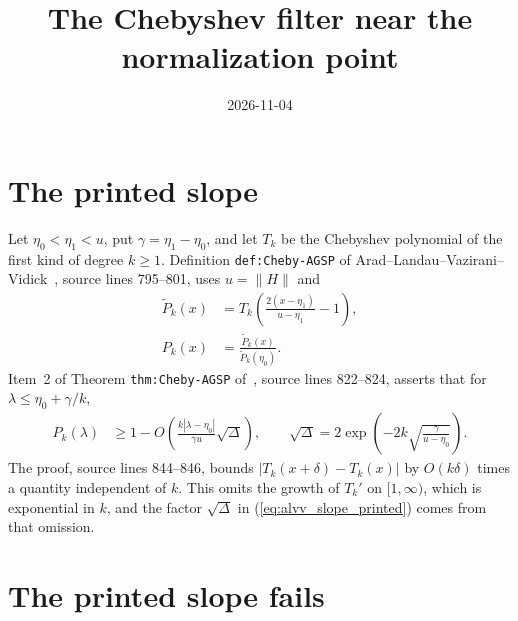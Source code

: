 \documentclass{article}
\title{The Chebyshev filter near the normalization point}
\author{}
\date{2026-11-04}
\begin{document}
\maketitle
{}

\section{The printed slope}

Let $\eta_0<\eta_1<u$, put $\gamma=\eta_1-\eta_0$, and let $T_k$ be the
Chebyshev polynomial of the first kind of degree $k\ge1$.
Definition \texttt{def:Cheby-AGSP} of
Arad--Landau--Vazirani--Vidick~\cite{Arad2016RigorousRG}, source lines
795--801, uses $u=\|H\|$ and
\begin{align}
    \tilde P_k(x) & =T_k\left(\frac{2(x-\eta_1)}{u-\eta_1}-1\right),
    \label{eq:alvv_slope_unnormalized}\\
    P_k(x)        & =\frac{\tilde P_k(x)}{\tilde P_k(\eta_0)}.
    \label{eq:alvv_slope_normalized}
\end{align}
Item~2 of Theorem \texttt{thm:Cheby-AGSP} of~\cite{Arad2016RigorousRG},
source lines 822--824, asserts that for $\lambda\le\eta_0+\gamma/k$,
\begin{align}
    P_k(\lambda) & \ge1-O\left(\frac{k|\lambda-\eta_0|}{\gamma u}
    \sqrt\Delta\right),
    \qquad
    \sqrt\Delta=2\exp\left(-2k\sqrt{\frac{\gamma}{u-\eta_0}}\right).
    \label{eq:alvv_slope_printed}
\end{align}
The proof, source lines 844--846, bounds $|T_k(x+\delta)-T_k(x)|$ by
$O(k\delta)$ times a quantity independent of $k$. This omits the growth of
$T_k'$ on $[1,\infty)$, which is exponential in $k$, and the factor $\sqrt\Delta$
in (\ref{eq:alvv_slope_printed}) comes from that omission.

\section{The printed slope fails}
\end{document}
